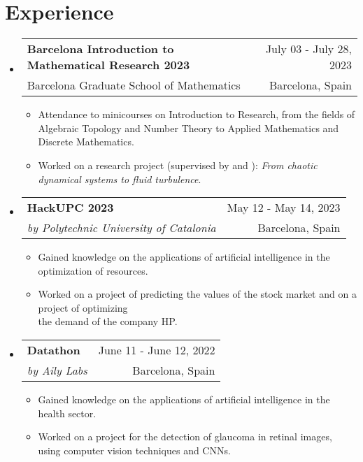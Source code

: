 \documentclass[a4paper,11pt]{article}
\makeatletter
\newcommand{\resumeQuadHeading}[4]{
  \item
  \begin{tabular*}{0.96\textwidth}[t]{l@{\extracolsep{\fill}}r}
    \textbf{#1} & \small #2 \\
    \small#3 & \small #4 \\
  \end{tabular*}
}
\newcommand{\resumeHeadingListStart}{
  \begin{itemize}[leftmargin=0.15in, label={}]
}
\newcommand{\resumeHeadingListEnd}{\end{itemize}}
\makeatother
\begin{document}
\section{Experience}
\resumeHeadingListStart{}
\resumeQuadHeading{Barcelona Introduction to Mathematical Research 2023}{July 03 - July 28, 2023}{Barcelona Graduate School of Mathematics}{Barcelona, Spain}
\begin{itemize}[leftmargin=3em, itemsep=0.1em, topsep=2pt]
  \item \small Attendance to minicourses on Introduction to Research, from the fields of Algebraic Topology and Number Theory to Applied Mathematics and Discrete Mathematics.
  \item \small Worked on a research project (supervised by \href{https://web.mat.upc.edu/jezabel.curbelo/}{} and \href{https://df.upc.edu/en/instabilities/people/alvaro.meseguer}{}): \emph{From chaotic dynamical systems to fluid turbulence}.
\end{itemize}
\resumeHeadingListEnd{}


\resumeHeadingListStart{}
\resumeQuadHeading{HackUPC 2023}{May 12 - May 14, 2023}{\textit{by Polytechnic University of Catalonia}}{Barcelona, Spain}
\begin{itemize}[leftmargin=3em, itemsep=0.1em, topsep=2pt]
  \item \small Gained knowledge on the applications of artificial intelligence in the optimization of resources.
  \item \small Worked on a project of predicting the values of the stock market and on a project of optimizing\\ the demand of the company HP.
\end{itemize}
\resumeHeadingListEnd{}


\resumeHeadingListStart{}
\resumeQuadHeading{Datathon}{June 11 - June 12, 2022}{\textit{by Aily Labs}}{Barcelona, Spain}
\begin{itemize}[leftmargin=3em, itemsep=0.1em, topsep=2pt]
  \item \small Gained knowledge on the applications of artificial intelligence in the health sector.
  \item \small Worked on a project for the detection of glaucoma in retinal images, using computer vision tech\-niques and CNNs.
\end{itemize}
\resumeHeadingListEnd{}
\end{document}
